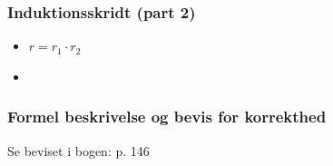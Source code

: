\begin{frame}
\frametitle{Induktionsskridt (part 2)}
\begin{itemize}
\item $r=r_1\cdot r_2$ \\
\begin{center}
\end{center}
\item {} \\
\begin{center}
\end{center}
\end{itemize}
\end{frame}

\begin{frame}
\frametitle{Formel beskrivelse og bevis for korrekthed}
Se beviset i bogen: p. 146
\end{frame}

